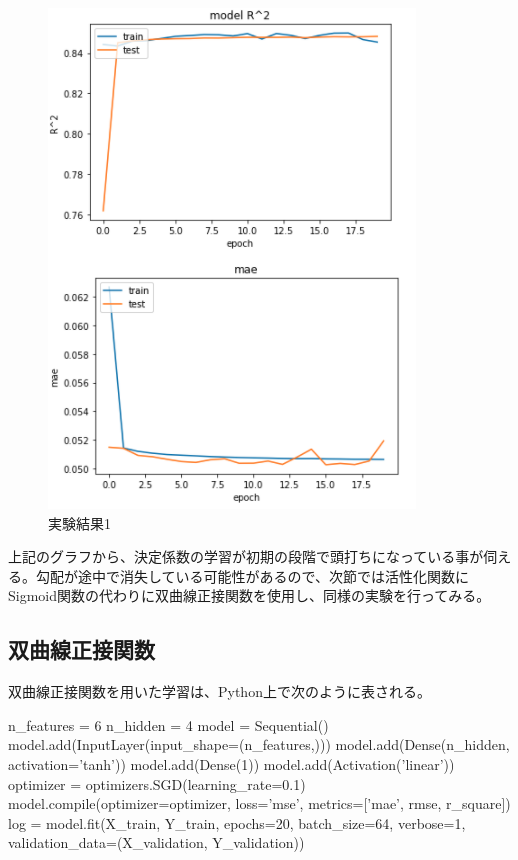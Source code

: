 \documentclass{report}
\begin{document}
\begin{figure}[H]
\begin{center}
\includegraphics[width=\linewidth]{experiment1.png}
\caption{実験結果1}
\end{center}
\end{figure}

上記のグラフから、決定係数の学習が初期の段階で頭打ちになっている事が伺える。勾配が途中で消失している可能性があるので、次節では活性化関数にSigmoid関数の代わりに双曲線正接関数を使用し、同様の実験を行ってみる。

\subsection{双曲線正接関数}

双曲線正接関数を用いた学習は、Python上で次のように表される。
\\

\begin{python}[caption=双曲線正接関数]
n_features = 6
n_hidden   = 4
model = Sequential()
model.add(InputLayer(input_shape=(n_features,)))
model.add(Dense(n_hidden, activation='tanh'))
model.add(Dense(1))
model.add(Activation('linear'))
optimizer = optimizers.SGD(learning_rate=0.1)
model.compile(optimizer=optimizer,
              loss='mse', metrics=['mae', rmse, r_square])
log = model.fit(X_train, Y_train, epochs=20, batch_size=64, 
verbose=1,
         validation_data=(X_validation, Y_validation))
\end{python}
\end{document}
